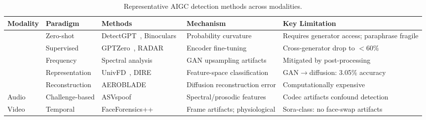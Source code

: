 
\begin{table}[htbp]
\centering
\caption{Representative AIGC detection methods across modalities.}
\label{tab:detection}

\fontsize{7}{7}\selectfont
\setlength{\tabcolsep}{5pt}
\renewcommand{\arraystretch}{1.3}

\begin{tabularx}{\textwidth}{
  >{\centering\arraybackslash}p{1.2cm}
  >{\raggedright\arraybackslash}p{2.0cm}
  >{\raggedright\arraybackslash}p{3.4cm}
  >{\raggedright\arraybackslash}p{3.8cm}
  >{\raggedright\arraybackslash}X
}
\toprule
\textbf{Modality} & \textbf{Paradigm} & \textbf{Methods} & \textbf{Mechanism} & \textbf{Key Limitation} \\
\midrule

\rowcolor{rowgray}
\multirow{2}{*}{Text}
  & Zero-shot
  & DetectGPT~\cite{mitchell2023detectgpt}, Binoculars~\cite{hans2024binoculars}
  & Probability curvature
  & Requires generator access; paraphrase fragile \\[6pt]

\rowcolor{rowgray}
  & Supervised
  & GPTZero~\cite{adam2026gptzero}, RADAR~\cite{hu2023radar}
  & Encoder fine-tuning
  & Cross-generator drop to $<$60\%~\cite{macko2023multitude} \\

\addlinespace[2pt]
\cmidrule(lr){1-5}
\addlinespace[2pt]

\multirow{3}{*}{Image}
  & Frequency
  & Spectral analysis
  & GAN upsampling artifacts
  & Mitigated by post-processing \\[6pt]

  & Representation
  & UnivFD~\cite{ojha2023univfd}, DIRE~\cite{wang2023dire}
  & Feature-space classification
  & GAN$\to$diffusion: 3.05\% accuracy \\[6pt]

  & Reconstruction
  & AEROBLADE~\cite{ricker2024aeroblade}
  & Diffusion reconstruction error
  & Computationally expensive \\

\addlinespace[2pt]
\cmidrule(lr){1-5}
\addlinespace[2pt]

\rowcolor{rowgray}
Audio
  & Challenge-based
  & ASVspoof~\cite{asvspoof2019,asvspoof2021}
  & Spectral/prosodic features
  & Codec artifacts confound detection \\

\addlinespace[2pt]
\cmidrule(lr){1-5}
\addlinespace[2pt]

Video
  & Temporal
  & FaceForensics++~\cite{rossler2019faceforensics}
  & Frame artifacts; physiological
  & Sora-class: no face-swap artifacts \\

\bottomrule
\end{tabularx}
\end{table}
